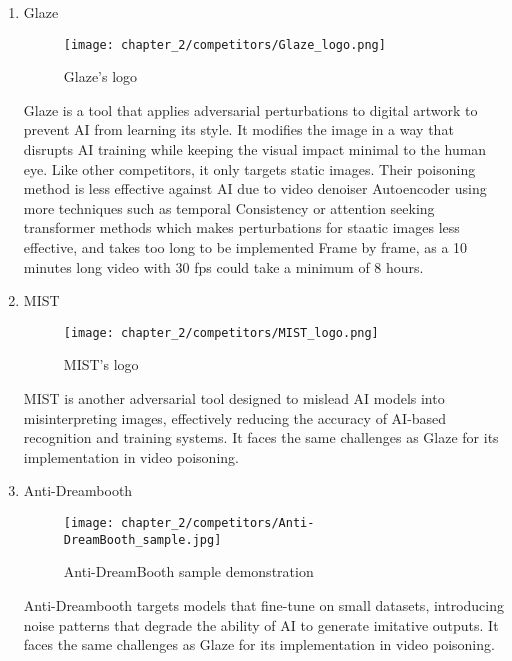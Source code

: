     \begin{enumerate}
        \item Glaze

        \begin{figure}[h]
            \centering
            \texttt{[image: chapter\_2/competitors/Glaze\_logo.png]}
            \caption{Glaze's logo}
        
        \end{figure}
        
        \par Glaze is a tool that applies adversarial perturbations to digital artwork to prevent AI from learning its style. It modifies the image in a way that disrupts AI training while keeping the visual impact minimal to the human eye.
        Like other competitors, it only targets static images. Their poisoning method is less effective against AI due to video denoiser Autoencoder using more techniques such as temporal Consistency or attention seeking transformer methods which makes perturbations for staatic images less effective, and takes too long to be implemented Frame by frame, as a 10 minutes long video with 30 fps could take a minimum of 8 hours.
        
        \item MIST
        \begin{figure}[h]
            \centering
            \texttt{[image: chapter\_2/competitors/MIST\_logo.png]}
            \caption{MIST's logo}
        
        \end{figure}
        \par MIST is another adversarial tool designed to mislead AI models into misinterpreting images, effectively reducing the accuracy of AI-based recognition and training systems. It faces the same challenges as Glaze for its implementation in video poisoning.

        
        \item Anti-Dreambooth
        \begin{figure}[h]
            \centering
            \texttt{[image: chapter\_2/competitors/Anti-DreamBooth\_sample.jpg]}
            \caption{Anti-DreamBooth sample demonstration}
        
        \end{figure}
        \par Anti-Dreambooth targets models that fine-tune on small datasets, introducing noise patterns that degrade the ability of AI to generate imitative outputs. It faces the same challenges as Glaze for its implementation in video poisoning.


\end{enumerate}
